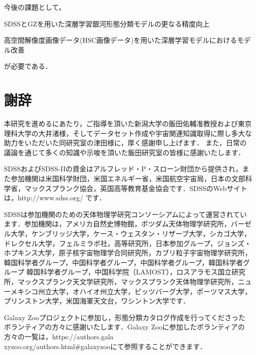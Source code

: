 \documentclass[a4j, 11pt]{jreport}
\begin{document}
今後の課題として，
\begin{inparaenum}[(1)]
 \item SDSSとGZを用いた深層学習銀河形態分類モデルの更なる精度向上
 \item 高空間解像度画像データ(HSC画像データ)を用いた深層学習モデルにおけるモデル改善
\end{inparaenum}
が必要である．



\newpage


\newpage
\chapter*{謝辞}
本研究を進めるにあたり，ご指導を頂いた新潟大学の飯田佑輔准教授および東京理科大学の大井渚様，そしてデータセット作成や宇宙関連知識取得に際し多大な助力をいただいた同研究室の津田様に，厚く感謝申し上げます．
また，日常の議論を通じて多くの知識や示唆を頂いた飯田研究室の皆様に感謝いたします．

SDSSおよびSDSS-IIの資金はアルフレッド・P・スローン財団から提供され，また参加機関は米国科学財団，米国エネルギー省，米国航空宇宙局，日本の文部科学省，マックスプランク協会，英国高等教育基金協会です．SDSSのWebサイトは，http://www.sdss.org/ です． 

SDSSは参加機関のための天体物理学研究コンソーシアムによって運営されています．参加機関は，アメリカ自然史博物館，ポツダム天体物理学研究所，バーゼル大学，ケンブリッジ大学，ケース・ウェスタン・リザーブ大学，シカゴ大学，ドレクセル大学，フェルミラボ社，高等研究所，日本参加グループ，ジョンズ・ホプキンス大学，原子核宇宙物理学合同研究所，カブリ粒子宇宙物理学研究所，韓国科学者グループ，中国科学者グループ，中国科学者グループ，韓国科学者グループ 韓国科学者グループ，中国科学院（LAMOST），ロスアラモス国立研究所，マックスプランク天文学研究所，マックスプランク天体物理学研究所，ニューメキシコ州立大学，オハイオ州立大学，ピッツバーグ大学，ポーツマス大学，プリンストン大学，米国海軍天文台，ワシントン大学です．

Galaxy Zooプロジェクトに参加し，形態分類カタログ作成を行ってくださったボランティアの方々に感謝いたします．Galaxy Zooに参加したボランティアの方々の一覧は，https://authors.gala\\xyzoo.org/authors.html\#galaxyzooにて参照することができます．
\end{document}
